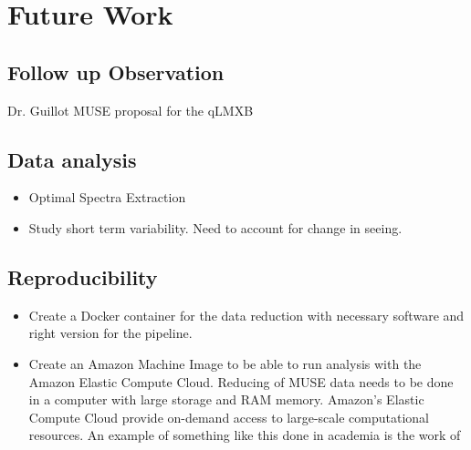 \chapter{Future Work}\label{chap:future}
\thispagestyle{fancy}

\section{Follow up Observation}

    Dr. Guillot MUSE proposal for the qLMXB
    
\section{Data analysis}
    
    \begin{itemize}
\item Optimal Spectra Extraction \citep{horne_emission_1986}
\item Study short term variability. Need to account for change in seeing.
\end{itemize}

\section{Reproducibility}
\begin{itemize}
\item  Create a Docker container for the data reduction with necessary software and right version for the pipeline. 
\item Create an Amazon Machine Image to be able to run analysis with the Amazon Elastic Compute Cloud. Reducing of MUSE data needs to be done in a computer with large storage and RAM memory. Amazon's Elastic Compute Cloud provide on-demand access to large-scale computational resources. An example of something like this done in academia is the work of \cite{ragan-kelley_collaborative_2013}
\end{itemize}

